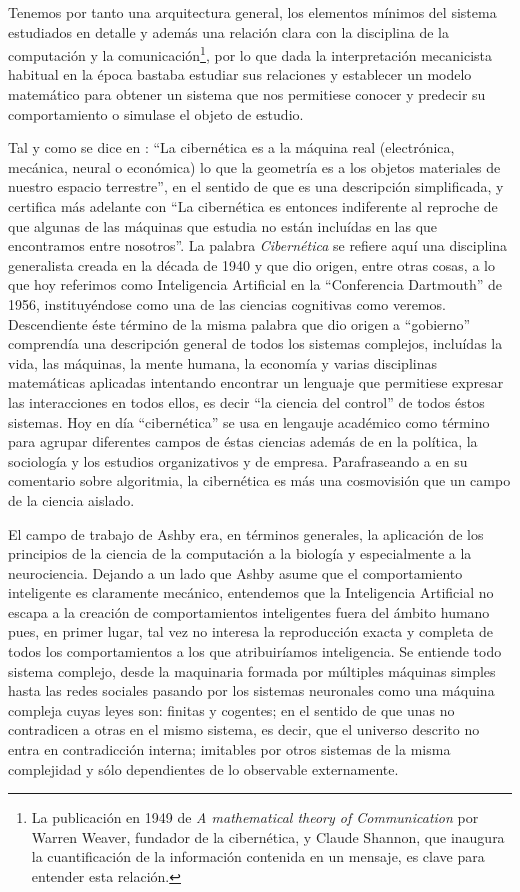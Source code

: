 \documentclass[12pt]{memoir}
\begin{document}
Tenemos por tanto una arquitectura general, los elementos mínimos del sistema estudiados en detalle y además una relación clara con la disciplina de la computación y la comunicación\footnote{La publicación en 1949 de \textit{A mathematical theory of Communication} por Warren Weaver, fundador de la cibernética, y Claude Shannon, que inaugura la cuantificación de la información contenida en un mensaje, es clave para entender esta relación.}, por lo que dada la interpretación mecanicista habitual en la época bastaba estudiar sus relaciones y establecer un modelo matemático para obtener un sistema que nos permitiese conocer y predecir su comportamiento o simulase el objeto de estudio.

Tal y como se dice en \cite{ciberneticsAshby}: ``La cibernética es a la máquina real (electrónica, mecánica, neural o económica) lo que la geometría es a los objetos materiales de nuestro espacio terrestre'', en el sentido de que es una descripción simplificada, y certifica más adelante con ``La cibernética es entonces indiferente al reproche de que algunas de las máquinas que estudia no están incluídas en las que encontramos entre nosotros''. La palabra \textit{Cibernética} se refiere aquí una disciplina generalista creada en la década de 1940 y que dio origen, entre otras cosas, a lo que hoy referimos como Inteligencia Artificial en la ``Conferencia Dartmouth'' de 1956, instituyéndose como una de las ciencias cognitivas como veremos. Descendiente éste término de la misma palabra que dio origen a ``gobierno'' comprendía una descripción general de todos los sistemas complejos, incluídas la vida, las máquinas, la mente humana, la economía y varias disciplinas matemáticas aplicadas intentando encontrar un lenguaje que permitiese expresar las interacciones en todos ellos, es decir ``la ciencia del control'' de todos éstos sistemas. Hoy en día ``cibernética'' se usa en lengauje académico como término para agrupar diferentes campos de éstas ciencias además de en la política, la sociología y los estudios organizativos y de empresa. Parafraseando a \cite{pylyshyn70} en su comentario sobre algoritmia, la cibernética es más una cosmovisión que un campo de la ciencia aislado.

El campo de trabajo de Ashby era, en términos generales, la aplicación de los principios de la ciencia de la computación a la biología y especialmente a la neurociencia. Dejando a un lado que Ashby asume que el comportamiento inteligente es claramente mecánico, entendemos que la Inteligencia Artificial no escapa a la creación de comportamientos inteligentes fuera del ámbito humano pues, en primer lugar, tal vez no interesa la reproducción exacta y completa de todos los comportamientos a los que atribuiríamos inteligencia. Se entiende todo sistema complejo, desde la maquinaria formada por múltiples máquinas simples hasta las redes sociales pasando por los sistemas neuronales como una máquina compleja cuyas leyes son: finitas y cogentes; en el sentido de que unas no contradicen a otras en el mismo sistema, es decir, que el universo descrito no entra en contradicción interna; imitables por otros sistemas de la misma complejidad y sólo dependientes de lo observable externamente.
 
\end{document}
